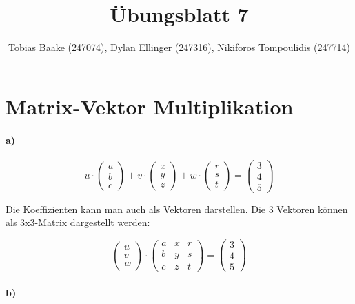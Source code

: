 \documentclass{article}
\title{Übungsblatt 7}
\author{Tobias Baake (247074), Dylan Ellinger (247316), Nikiforos Tompoulidis (247714)}
\begin{document}
\maketitle

\section{Matrix-Vektor Multiplikation}

\paragraph{a)}

$$ u \cdot \begin{pmatrix} a \\ b \\ c \end{pmatrix} + v \cdot \begin{pmatrix} x \\ y \\ z \end{pmatrix} + w \cdot \begin{pmatrix} r \\ s \\ t \end{pmatrix} = \begin{pmatrix} 3 \\ 4 \\ 5 \end{pmatrix} $$

Die Koeffizienten kann man auch als Vektoren darstellen. Die 3 Vektoren können als 3x3-Matrix dargestellt werden:

$$ \begin{pmatrix} u \\ v \\ w \end{pmatrix} \cdot \begin{pmatrix} a & x & r \\ b & y & s \\ c & z & t \end{pmatrix} = \begin{pmatrix} 3 \\ 4 \\ 5 \end{pmatrix} $$

\paragraph{b)}
\end{document}
